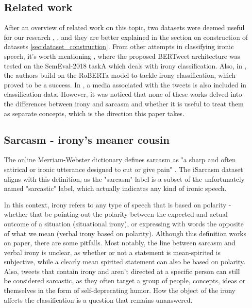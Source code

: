 \documentclass[10pt, a4paper]{article}
\begin{document}
\subsection{Related work}
After an overview of related work on this topic, two datasets were deemed useful for our research \citep{iSarcasm}, \citep{semeval-2018},
and they are better explained in the section on construction of datasets \ref{sec:dataset_construction}. From other attempts in classifying 
ironic speech, it's worth mentioning \citep{bertweet}, where the proposed BERTweet architecture was tested on the SemEval-2018 taskA which 
deals with irony classification. Also, in \citep{transformers4irony-2020}, the authors build on the RoBERTa \citep{roberta} model to tackle 
irony classification, which proved to be a success. In \citep{transformers4irony-2023}, a media associated with the tweets is also included 
in classification data. However, it was noticed that none of these works delved into the differences between irony and sarcasm and whether it 
is useful to treat them as separate concepts, which is the direction this paper takes.
 
 
\subsection{Sarcasm - irony's meaner cousin}\label{sec:sarcasm_definition}
The online Merriam-Webster dictionary defines sarcasm as "a sharp and often satirical or ironic utterance designed to 
cut or give pain" \citep{mw-dictionary}. The iSarcasm dataset \citep{iSarcasm} aligns with this definition, as 
the "sarcasm" label is a subset of the unfortunately named "sarcastic" label, which actually 
indicates any kind of ironic speech. 

In this context, irony refers to any type of speech that is based on polarity - whether that be pointing out the polarity 
between the expected and actual outcome of a situation (situational irony), or expressing with words the opposite of what 
we mean (verbal irony based on polarity). Although this definition works on paper, there are some pitfalls. Most notably, 
the line between sarcasm and verbal irony is unclear, as whether or not a statement is mean-spirited is subjective, while 
a clearly mean spirited statement can also be based on polarity. Also, tweets that contain irony and aren’t directed at a 
specific person can still be considered sarcastic, as they often target a group of people, concepts, ideas or themselves 
in the form of self-deprecating humor. How the object of the irony affects the classification is a question that remains unanswered.
\end{document}
